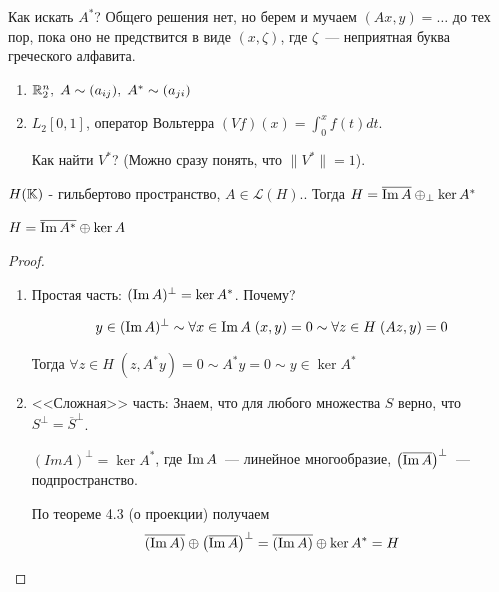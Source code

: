 \begin{lemmanote}
    Как искать $A^*$? Общего решения нет, но берем и мучаем $(Ax, y) = \ldots$ до тех пор, пока оно не предствится в виде $(x, \zeta)$, 
    где $\zeta$~--- неприятная буква греческого алфавита.
\end{lemmanote}

\begin{example}
\begin{enumerate}
    \item $\mathbb{R}^n_2, \; A \sim (a_{ij}), \; A^* \sim (a_{ji})$
    \item $L_2[0,1]$, оператор Вольтерра $(V f)(x) = \int_0^x f(t) dt$.
    
    Как найти $V^*$? (Можно сразу понять, что $\|V^*\| = 1$).
\end{enumerate}
\end{example}

\begin{theorem}[9.2]\label{9.2}
    $H(\mathbb{K})$ - гильбертово пространство, $A \in \mathcal{L}(H)$.. 
    Тогда $H = \overline{\operatorname{Im} A} \oplus_{\perp} \ker A^*$
\end{theorem}

\begin{note}
$H = \overline{\operatorname{Im} A^*} \oplus \ker A$
\end{note}

\begin{proof}
    \begin{enumerate}
        \item Простая часть: $(\operatorname{Im} A)^\perp = \ker A^*$. Почему?

        \[ y \in (\operatorname{Im} A)^\perp \sim \forall x \in \operatorname{Im} A \; (x,y)=0 \sim \forall z \in H \; (Az, y)=0\]

        Тогда $\forall z \in H \; (z, A^*y)=0 \sim A^*y=0 \sim y \in \ker A^*$
        \item <<Сложная>> часть:
        Знаем, что для любого множества $S$ верно, что $S^{\perp} = \overline{S}^{\perp}$.

        $(Im A)^{\perp} = \ker A^*$, где $\operatorname{Im} A$~--- линейное многообразие,
        $\left( \overline{\operatorname{Im} A} \right)^{\perp}$~--- подпространство.

        По теореме 4.3 (о проекции) получаем 
        \[ \overline{(\operatorname{Im} A)} \oplus \left( \overline{\operatorname{Im} A} \right)^{\perp}=\overline{(\operatorname{Im} A)} \oplus \ker A^* = H \]
    \end{enumerate}
\end{proof}

